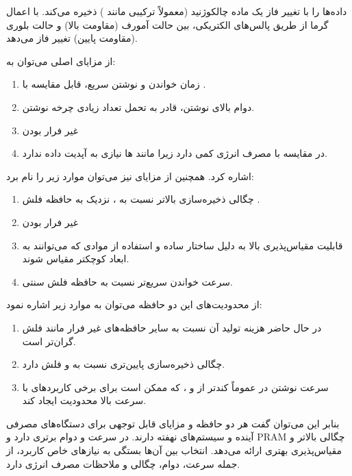 \documentclass[12pt]{exam}
\begin{document}
\begin{questions}
 داده‌ها را با تغییر فاز یک ماده چالکوژنید (معمولاً ترکیبی مانند ) ذخیره می‌کند. با اعمال گرما از طریق پالس‌های الکتریکی، بین حالت آمورف (مقاومت بالا) و حالت بلوری (مقاومت پایین) تغییر فاز می‌دهد.

از مزایای اصلی  می‌توان به:
\begin{enumerate}
	\item زمان خواندن و نوشتن سریع، قابل مقایسه با .
	\item دوام بالای نوشتن، قادر به تحمل تعداد زیادی چرخه نوشتن.
	\item غیر فرار بودن
	\item در مقایسه با  مصرف انرژی کمی دارد زیرا مانند  ها نیازی به آپدیت داده ندارد.
\end{enumerate}

اشاره کرد. همچنین از مزایای  نیز می‌توان موارد زیر را نام برد:
\begin{enumerate}
	\item چگالی ذخیره‌سازی بالاتر نسبت به \lr{}، نزدیک به حافظه فلش .
	\item غیر فرار بودن
	\item قابلیت مقیاس‌پذیری بالا به دلیل ساختار ساده و استفاده از موادی که می‌توانند به ابعاد کوچکتر مقیاس شوند.
	\item سرعت خواندن سریع‌تر نسبت به حافظه فلش  سنتی.
\end{enumerate}

از محدودیت‌های این دو حافظه می‌توان به موارد زیر اشاره نمود:
\begin{enumerate}
	\item در حال حاضر هزینه تولید  آن نسبت به سایر حافظه‌های غیر فرار مانند فلش  گران‌تر است.
	
	\item 
	 چگالی ذخیره‌سازی پایین‌تری نسبت به  و فلش  دارد.
	
	\item 
سرعت نوشتن در  عموماً کندتر از  و ، که ممکن است برای برخی کاربردهای با سرعت بالا محدودیت ایجاد کند.
\end{enumerate}

بنابر این می‌توان گفت هر دو حافظه  و  مزایای قابل توجهی برای دستگاه‌های مصرفی آینده و سیستم‌های نهفته دارند.  در سرعت و دوام برتری دارد و PRAM چگالی بالاتر و مقیاس‌پذیری بهتری ارائه می‌دهد. انتخاب بین آن‌ها بستگی به نیازهای خاص کاربرد، از جمله سرعت، دوام، چگالی و ملاحظات مصرف انرژی دارد.






\end{questions}
\end{document}
